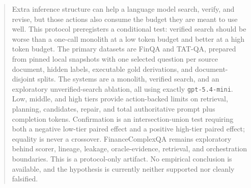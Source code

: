 \begin{abstract}
Extra inference structure can help a language model search, verify, and revise,
but those actions also consume the budget they are meant to use well. This
protocol preregisters a conditional test: verified search should be worse than a
one-call monolith at a low token budget and better at a high token budget. The
primary datasets are FinQA and TAT-QA, prepared from pinned local snapshots with
one selected question per source document, hidden labels, executable gold
derivations, and document-disjoint splits. The systems are a monolith, verified
search, and an exploratory unverified-search ablation, all using exactly
\texttt{gpt-5.4-mini}. Low, middle, and high tiers provide action-backed limits
on retrieval, planning, candidates, repair, and total authoritative prompt plus
completion tokens. Confirmation is an intersection-union test requiring both a
negative low-tier paired effect and a positive high-tier paired effect; equality
is never a crossover. FinanceComplexQA remains exploratory behind scorer,
lineage, leakage, oracle-evidence, retrieval, and orchestration boundaries. This
is a protocol-only artifact. No empirical conclusion is available, and the
hypothesis is currently neither supported nor cleanly falsified.
\end{abstract}
